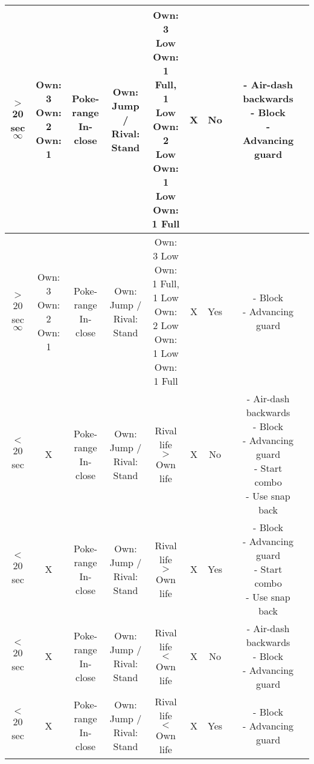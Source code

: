 \documentclass{article}
\begin{document}
\begin{landscape}
\begin{table}[h!]
\begin{center}
\begin{tabular*}{24cm}{c|c|c|c|c|c|c|c|c|c}
      \hline
      \makecell{$>$ 20 sec \\ $\infty$} & \makecell{Own: 3 \\ Own: 2 \\ Own: 1} & \makecell{Poke-range \\ In-close} & Own: Jump / Rival: Stand & \makecell{Own: 3 Low \\ Own: 1 Full, 1 Low \\ Own: 2 Low \\ Own: 1 Low \\ Own: 1 Full} & X & No & & \makecell{- Air-dash backwards \\ - Block \\ - Advancing guard}\\
      \hline
      \makecell{$>$ 20 sec \\ $\infty$} & \makecell{Own: 3 \\ Own: 2 \\ Own: 1} & \makecell{Poke-range \\ In-close} & Own: Jump / Rival: Stand & \makecell{Own: 3 Low \\ Own: 1 Full, 1 Low \\ Own: 2 Low \\ Own: 1 Low \\ Own: 1 Full} & X & Yes & & \makecell{- Block \\ - Advancing guard}\\
      \hline
      $<$ 20 sec & X & \makecell{Poke-range \\ In-close} & Own: Jump / Rival: Stand & Rival life $>$ Own life & X & No & & \makecell{- Air-dash backwards \\ - Block \\ - Advancing guard \\ - Start combo \\ - Use snap back}\\
      \hline
      $<$ 20 sec & X & \makecell{Poke-range \\ In-close} & Own: Jump / Rival: Stand & Rival life $>$ Own life & X & Yes & & \makecell{- Block \\ - Advancing guard \\ - Start combo \\ - Use snap back}\\
      \hline
      $<$ 20 sec & X & \makecell{Poke-range \\ In-close} & Own: Jump / Rival: Stand & Rival life $<$ Own life & X & No & & \makecell{- Air-dash backwards \\ - Block \\ - Advancing guard}\\   
      \hline
      $<$ 20 sec & X & \makecell{Poke-range \\ In-close} & Own: Jump / Rival: Stand & Rival life $<$ Own life & X & Yes & & \makecell{- Block \\ - Advancing guard}\\    
      \hline
      \end{tabular*}
  \end{center}
\end{table}


\end{landscape}
\end{document}
